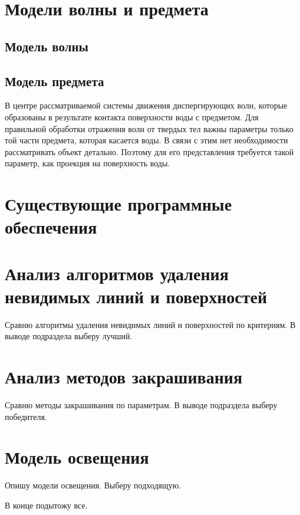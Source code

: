 \section{Модели волны и предмета}

\subsection{Модель волны}

\subsection{Модель предмета}

В центре рассматриваемой системы движения диспергирующих волн, которые образованы в результате контакта поверхности воды с предметом. Для правильной обработки отражения волн от твердых тел важны параметры только той части предмета, которая касается воды.  В связи с этим нет необходимости рассматривать объект детально. Поэтому для его представления требуется такой параметр, как проекция на поверхность воды.

\section{Существующие программные обеспечения}

\section{Анализ алгоритмов удаления невидимых линий и поверхностей}

Сравню алгоритмы удаления невидимых линий и поверхностей по критериям. В выводе подраздела выберу лучший.

\section{Анализ методов закрашивания}

Сравню методы закрашивания по параметрам. В выводе подраздела выберу победителя.

\section{Модель освещения}

Опишу модели освещения. Выберу подходящую.

В конце подытожу все.